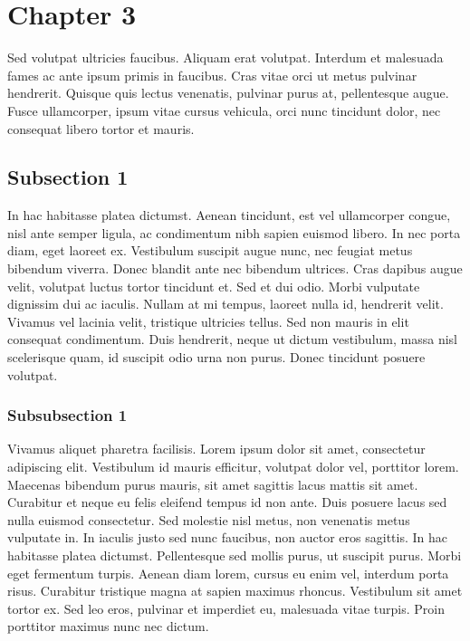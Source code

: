 \section{Chapter 3}

Sed volutpat ultricies faucibus. Aliquam erat volutpat. Interdum et malesuada fames ac ante ipsum primis in faucibus. Cras vitae orci ut metus pulvinar hendrerit. Quisque quis lectus venenatis, pulvinar purus at, pellentesque augue. Fusce ullamcorper, ipsum vitae cursus vehicula, orci nunc tincidunt dolor, nec consequat libero tortor et mauris.

\subsection{Subsection 1}
	In hac habitasse platea dictumst. Aenean tincidunt, est vel ullamcorper congue, nisl ante semper ligula, ac condimentum nibh sapien euismod libero. In nec porta diam, eget laoreet ex. Vestibulum suscipit augue nunc, nec feugiat metus bibendum viverra. Donec blandit ante nec bibendum ultrices. Cras dapibus augue velit, volutpat luctus tortor tincidunt et. Sed et dui odio. Morbi vulputate dignissim dui ac iaculis. Nullam at mi tempus, laoreet nulla id, hendrerit velit. Vivamus vel lacinia velit, tristique ultricies tellus. Sed non mauris in elit consequat condimentum. Duis hendrerit, neque ut dictum vestibulum, massa nisl scelerisque quam, id suscipit odio urna non purus. Donec tincidunt posuere volutpat.

	\subsubsection*{Subsubsection 1}
		Vivamus aliquet pharetra facilisis. Lorem ipsum dolor sit amet, consectetur adipiscing elit. Vestibulum id mauris efficitur, volutpat dolor vel, porttitor lorem. Maecenas bibendum purus mauris, sit amet sagittis lacus mattis sit amet. Curabitur et neque eu felis eleifend tempus id non ante. Duis posuere lacus sed nulla euismod consectetur. Sed molestie nisl metus, non venenatis metus vulputate in. In iaculis justo sed nunc faucibus, non auctor eros sagittis. In hac habitasse platea dictumst. Pellentesque sed mollis purus, ut suscipit purus. Morbi eget fermentum turpis. Aenean diam lorem, cursus eu enim vel, interdum porta risus. Curabitur tristique magna at sapien maximus rhoncus. Vestibulum sit amet tortor ex. Sed leo eros, pulvinar et imperdiet eu, malesuada vitae turpis. Proin porttitor maximus nunc nec dictum.
